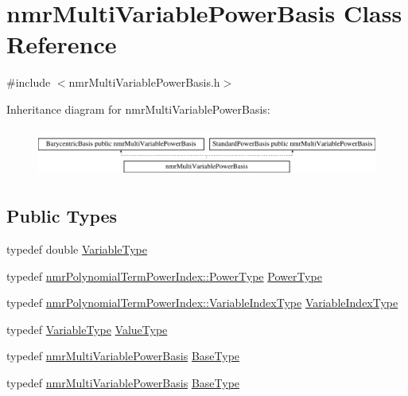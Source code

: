\hypertarget{classnmr_multi_variable_power_basis}{}\section{nmr\+Multi\+Variable\+Power\+Basis Class Reference}
\label{classnmr_multi_variable_power_basis}


{\ttfamily \#include $<$nmr\+Multi\+Variable\+Power\+Basis.\+h$>$}

Inheritance diagram for nmr\+Multi\+Variable\+Power\+Basis\+:\begin{figure}[H]
\begin{center}
\leavevmode
\includegraphics[height=1.632653cm]{dc/d0d/classnmr_multi_variable_power_basis}
\end{center}
\end{figure}
\subsection*{Public Types}
\begin{DoxyCompactItemize}
\item 
typedef double \hyperlink{classnmr_multi_variable_power_basis_a7089007a79cce8d2eb3672e2d61af06c}{Variable\+Type}
\item 
typedef \hyperlink{classnmr_polynomial_term_power_index_a2eec01c3a2c3f56f47982ceffd8e36ed}{nmr\+Polynomial\+Term\+Power\+Index\+::\+Power\+Type} \hyperlink{classnmr_multi_variable_power_basis_a2cb67df83e9fcac213848fa7a7295fcc}{Power\+Type}
\item 
typedef \hyperlink{classnmr_polynomial_term_power_index_ac982d5f82c3a95968e92d54c92cbc3e0}{nmr\+Polynomial\+Term\+Power\+Index\+::\+Variable\+Index\+Type} \hyperlink{classnmr_multi_variable_power_basis_ae125326a623043fcfd020aeeefd1cce6}{Variable\+Index\+Type}
\item 
typedef \hyperlink{classnmr_multi_variable_power_basis_a7089007a79cce8d2eb3672e2d61af06c}{Variable\+Type} \hyperlink{classnmr_multi_variable_power_basis_af4a74a68c8bac235645e3f37f2f464e5}{Value\+Type}
\item 
typedef \hyperlink{classnmr_multi_variable_power_basis}{nmr\+Multi\+Variable\+Power\+Basis} \hyperlink{classnmr_multi_variable_power_basis_aaf11c12fba7357db886d9eee2fc480b4}{Base\+Type}
\item 
typedef \hyperlink{classnmr_multi_variable_power_basis}{nmr\+Multi\+Variable\+Power\+Basis} \hyperlink{classnmr_multi_variable_power_basis_aaf11c12fba7357db886d9eee2fc480b4}{Base\+Type}
\end{DoxyCompactItemize}
